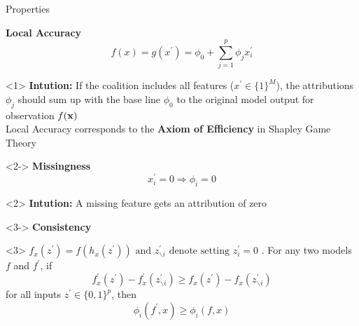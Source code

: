 \documentclass[11pt,compress,t,notes=noshow, aspectratio=169, xcolor=table]{beamer}
\begin{document}







\begin{vbframe}{Properties}

\textbf{Local Accuracy}
$$
f(x)=g\left(x^{\prime}\right)=\phi_{0}+\sum_{j=1}^{p} \phi_{j} x_{i}^{\prime}
$$
\begin{onlyenv}<1>
\textbf{Intution:} If the coalition includes all features ($x^{\prime}  \in \{1\}^M $), the attributions $\phi_j$ should sum up with the base line $\phi_0$ to the original model output for observation $f(\xv)$ \\
Local Accuracy corresponds to the \textbf{Axiom of Efficiency} in Shapley Game Theory 

\end{onlyenv}

\begin{onlyenv}<2->
\textbf{Missingness}
$$
x_{i}^{\prime}=0 \Longrightarrow \phi_{i}=0
$$
\end{onlyenv}

\begin{onlyenv}<2>
\textbf{Intution:}  A missing feature gets an attribution of zero
\end{onlyenv}

\begin{onlyenv}<3->
\textbf{Consistency} \\
\end{onlyenv}
\begin{onlyenv}<3>
$f_{x}\left(z^{\prime}\right)=f\left(h_{x}\left(z^{\prime}\right)\right) \text { and } z^{\prime}_{\backslash  i} \text{ denote setting } z_{i}^{\prime}=0$ . For any two
models $f$ and $f^{\prime}$, if
$$
f_{x}^{\prime}\left(z^{\prime}\right)-f_{x}^{\prime}\left(z^{\prime}_{\backslash i}\right) \geq f_{x}\left(z^{\prime}\right)-f_{x}\left(z^{\prime}_{\backslash i}\right)
$$
for all inputs $z^{\prime} \in \{0, 1\}^p$, then
$$
\phi_{i}\left(f^{\prime}, x\right) \geq \phi_{i}(f, x)
$$
\end{onlyenv}


\end{vbframe}
\end{document}
